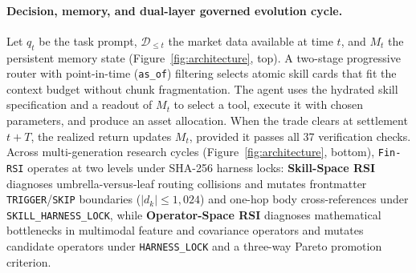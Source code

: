 \paragraph{Decision, memory, and dual-layer governed evolution cycle.}
Let $q_t$ be the task prompt, $\mathcal{D}_{\le t}$ the market data available at time $t$,
and $M_t$ the persistent memory state (Figure~\ref{fig:architecture}, top). A two-stage progressive router with point-in-time
(\texttt{as\_of}) filtering selects atomic skill cards that fit the context budget without
chunk fragmentation. The agent uses the hydrated skill specification and a readout of
$M_t$ to select a tool, execute it with chosen parameters, and produce an asset
allocation. When the trade clears at settlement $t+T$, the realized return updates
$M_t$, provided it passes all 37 verification checks. Across multi-generation research cycles
(Figure~\ref{fig:architecture}, bottom), \texttt{Fin-RSI} operates at two levels under SHA-256 harness locks: \textbf{Skill-Space RSI}
diagnoses umbrella-versus-leaf routing collisions and mutates frontmatter \texttt{TRIGGER}/\texttt{SKIP}
boundaries ($|d_k| \le 1{,}024$) and one-hop body cross-references under \texttt{SKILL\_HARNESS\_LOCK},
while \textbf{Operator-Space RSI} diagnoses mathematical bottlenecks in multimodal feature and
covariance operators and mutates candidate operators under \texttt{HARNESS\_LOCK} and a three-way
Pareto promotion criterion.


